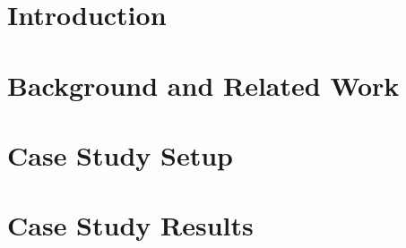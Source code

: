 \begin{abstract}






\end{abstract}




\section{Introduction}
\label{sec:intro}


\section{Background and Related Work}
\label{sec:related}


\section{Case Study Setup}
\label{sec:case}



\section{Case Study Results}

\label{sec:results}


